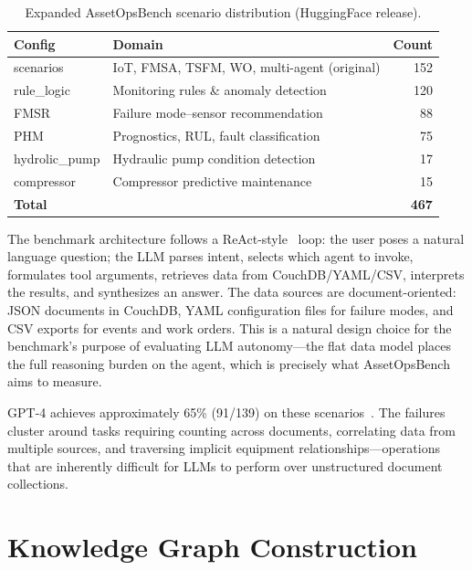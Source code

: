 \documentclass[11pt]{article}
\begin{document}
\begin{table}[t]
  \centering
  \caption{Expanded AssetOpsBench scenario distribution (HuggingFace release).}
  \label{tab:ibm-scenarios}
  \begin{tabular}{@{}llr@{}}
    \toprule
    \textbf{Config} & \textbf{Domain} & \textbf{Count} \\
    \midrule
    scenarios    & IoT, FMSA, TSFM, WO, multi-agent (original)  & 152 \\
    rule\_logic  & Monitoring rules \& anomaly detection         & 120 \\
    FMSR         & Failure mode--sensor recommendation           & 88 \\
    PHM          & Prognostics, RUL, fault classification        & 75 \\
    hydrolic\_pump & Hydraulic pump condition detection           & 17 \\
    compressor   & Compressor predictive maintenance             & 15 \\
    \midrule
    \textbf{Total} & & \textbf{467} \\
    \bottomrule
  \end{tabular}
\end{table}

The benchmark architecture follows a ReAct-style~\citep{yao2023react} loop: the user poses a natural language question; the LLM parses intent, selects which agent to invoke, formulates tool arguments, retrieves data from CouchDB/YAML/CSV, interprets the results, and synthesizes an answer. The data sources are document-oriented: JSON documents in CouchDB, YAML configuration files for failure modes, and CSV exports for events and work orders. This is a natural design choice for the benchmark's purpose of evaluating LLM autonomy---the flat data model places the full reasoning burden on the agent, which is precisely what AssetOpsBench aims to measure.

GPT-4 achieves approximately 65\% (91/139) on these scenarios~\citep{ibm2025assetopsbench}. The failures cluster around tasks requiring counting across documents, correlating data from multiple sources, and traversing implicit equipment relationships---operations that are inherently difficult for LLMs to perform over unstructured document collections.

\section{Knowledge Graph Construction}
\label{sec:kg-construction}
\end{document}
